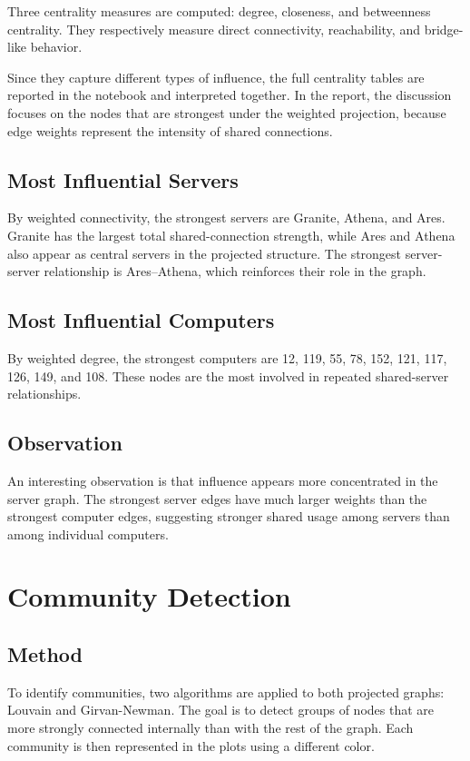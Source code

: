 \documentclass[11pt,a4paper]{article}
\begin{document}
Three centrality measures are computed: degree, closeness, and betweenness centrality. They respectively measure direct connectivity, reachability, and bridge-like behavior.

Since they capture different types of influence, the full centrality tables are reported in the notebook and interpreted together. In the report, the discussion focuses on the nodes that are strongest under the weighted projection, because edge weights represent the intensity of shared connections.

\subsection{Most Influential Servers}

By weighted connectivity, the strongest servers are Granite, Athena, and Ares. Granite has the largest total shared-connection strength, while Ares and Athena also appear as central servers in the projected structure. The strongest server-server relationship is Ares--Athena, which reinforces their role in the graph.

\subsection{Most Influential Computers}

By weighted degree, the strongest computers are 12, 119, 55, 78, 152, 121, 117, 126, 149, and 108. These nodes are the most involved in repeated shared-server relationships.

\subsection{Observation}

An interesting observation is that influence appears more concentrated in the server graph. The strongest server edges have much larger weights than the strongest computer edges, suggesting stronger shared usage among servers than among individual computers.

\section{Community Detection}

\subsection{Method}

To identify communities, two algorithms are applied to both projected graphs: Louvain and Girvan-Newman. The goal is to detect groups of nodes that are more strongly connected internally than with the rest of the graph. Each community is then represented in the plots using a different color.
\end{document}
